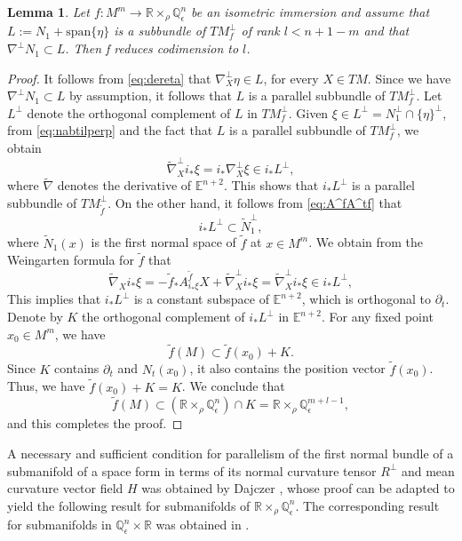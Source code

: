 \documentclass[11pt,a4paper]{article}
\newtheorem{lem}[defi]{Lemma}
\numberwithin{equation}{section}
\newcommand{\R}{\mathbb{R}}
\newcommand{\Q}{\mathbb{Q}}
\newcommand{\E}{\mathbb{E}}
\newcommand{\e}{\epsilon}
\newcommand{\WP}{\R\times_{\rho}\Q^n_{\epsilon}}
\newcommand{\co}{\colon}
\newcommand{\Span}{\text{span}}
\newcommand{\dt}{\partial_t}
\newcommand{\np}{\nabla^\perp}
\begin{document}
\begin{lem} \label{lem:RedCodim}
Let $f\co M^m\to\WP$ be an isometric immersion and assume that $L:= N_{1}+\Span\{\eta\}$ is a subbundle of $TM^\perp_f$ of rank $l<n+1-m$ and that $\nabla^{\perp}N_1\subset L$. Then f reduces codimension to $l$.
\end{lem}
\begin{proof}
It follows from \eqref{eq:dereta} that $\np_X\eta\in L$, for every $X\in TM$. Since we have $\np N_1\subset L$ by assumption, it follows that $L$ is a parallel subbundle of $TM^\perp_f$.
Let $L^\perp$ denote the orthogonal complement of $L$ in $TM^\perp_f$. Given $\xi\in L^\perp=N_1^\perp\cap\{\eta\}^\perp$, from \eqref{eq:nabtilperp} and the fact that $L$ is a parallel subbundle of $TM^\perp_f$, we obtain
\[
\widetilde{\nabla}_X^\perp i_{\ast}\xi = 
i_{\ast}\nabla^{\perp}_{X} \xi \in i_{\ast}L^{\perp},
\]
where $\widetilde{\nabla}$ denotes the derivative of $\E^{n+2}$. This shows that $i_{\ast}L^{\perp}$ is a parallel subbundle of $TM^\perp_{\tilde f}$. On the other hand, it follows from \eqref{eq:A^fA^tf} that
\[
i_{\ast}L^{\perp}\subset\widetilde{N}_{1}^{\perp},
\]
where $\widetilde{N}_1(x)$ is the first normal space of $\tilde{f}$ at $x\in M^m$. We obtain from the Weingarten formula for $\tilde{f}$ that
\[
\widetilde{\nabla}_{X}i_{\ast}\xi = -\tilde{f}_{\ast}A_{ i_{\ast}\xi}^{\tilde{f}}X + \widetilde{\nabla}_{X}^{\perp}  i_{\ast}\xi=\widetilde{\nabla}_{X}^{\perp}  i_{\ast}\xi \in i_{\ast}L^{\perp},
\]
This implies that $i_{\ast}L^{\perp}$ is a constant subspace of $\E^{n+2}$, which is orthogonal to $\dt$. 
Denote by $K$ the orthogonal complement of $i_{\ast}L^{\perp}$ in $\E^{n+2}$. For any fixed point $x_0\in M^m$, we have
\[
\tilde f(M)\subset\tilde{f}(x_0)+K.
\]
Since $K$ contains $\dt$ and $N_t(x_0)$, it also contains the position vector $\tilde{f}(x_0)$. Thus, we have $\tilde{f}(x_0)+K=K$. We conclude that
\[
\tilde{f}(M)\subset(\R\times_{\rho}\Q^{n}_{\epsilon})\cap K
= \R\times_{\rho}\Q^{m+l-1}_{\epsilon},
\]
and this completes the proof.
\end{proof}

A necessary and sufficient condition for parallelism of the first normal bundle of a submanifold of a space form in terms of its normal curvature tensor $R^\perp$ and mean curvature vector field $H$ was obtained by Dajczer \cite{Da}, whose proof can be adapted to yield the following result for submanifolds of $\WP$. The corresponding result for submanifolds in $\Q^n_\e\times\R$ was obtained in \cite[Theorem 1.7]{MeTo}.
\end{document}

